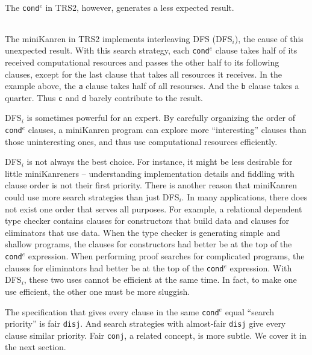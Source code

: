 \documentclass[format=acmlarge, review=true, authordraft=true]{acmart}
\newcommand{\conde}{\texttt{cond$^e$}}
\newcommand{\conj}{\texttt{conj}}
\newcommand{\disj}{\texttt{disj}}
\newcommand{\clisting}[1]{
\begin{center}
  \begin{tabular}{c}
	
    \end{tabular}
\end{center}
}
\newcommand{\DFSi }[0]{DFS$_{i}$}
\begin{document}
\clisting{Figures/run-repeato-fair.rkt}

The \conde{} in TRS2, however, generates a less expected result.

\clisting{Figures/run-repeato-idfs.rkt}

The miniKanren in TRS2 implements interleaving DFS (\DFSi), the cause of this 
unexpected result. With this search strategy, each \conde{} clause takes half 
of its received computational resources and passes the other half to its 
following clauses, except for the last clause that takes all resources it 
receives. In the example above, the \texttt{a} clause takes half of all 
resourses. And the \texttt{b} clause takes a quarter. Thus \texttt{c} and 
\texttt{d} barely contribute to the result.


\DFSi{} is sometimes powerful for an expert. By carefully organizing the order 
of \conde{} clauses, a miniKanren program can explore more ``interesting'' 
clauses than those uninteresting ones, and thus use computational resources 
efficiently.


\DFSi{} is not always the best choice. For instance, it might be less 
desirable for little miniKanreners -- understanding implementation details and 
fiddling with clause order is not their first priority. 
There is another reason that miniKanren could use more search strategies than
just \DFSi. In many applications, there does not exist one order that serves all
purposes. For example, a relational dependent type checker contains
clauses for constructors that build data and clauses for eliminators that use
data. When the type checker is generating simple and shallow programs,
the clauses for constructors had better be at the top of the
\conde{} expression.
When performing proof searches for complicated programs, the clauses for 
eliminators had better be at the top of the \conde{} expression. With \DFSi, 
these two uses cannot be efficient at the same time. In fact, to make one use 
efficient, the other one must be more sluggish.

The specification that gives every clause in the same \conde{} equal 
``search priority'' is fair \disj{}. And search strategies with 
almost-fair \disj{} give every clause similar priority. 
Fair \conj{}, a related concept, is more subtle. We cover it in the next 
section.
\end{document}
